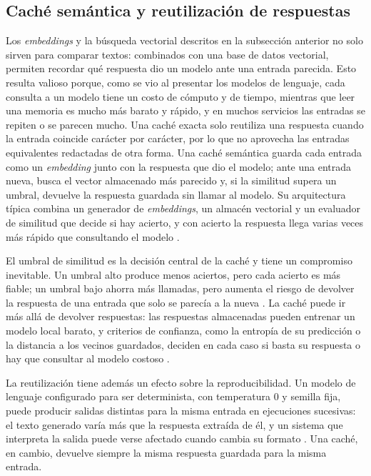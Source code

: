 \subsection{Caché semántica y reutilización de respuestas}\label{sec:mt_cache}

Los \textit{embeddings} y la búsqueda vectorial descritos en la subsección anterior no solo sirven para comparar textos: combinados con una base de datos vectorial, permiten recordar qué respuesta dio un modelo ante una entrada parecida. Esto resulta valioso porque, como se vio al presentar los modelos de lenguaje, cada consulta a un modelo tiene un costo de cómputo y de tiempo, mientras que leer una memoria es mucho más barato y rápido, y en muchos servicios las entradas se repiten o se parecen mucho. Una caché exacta solo reutiliza una respuesta cuando la entrada coincide carácter por carácter, por lo que no aprovecha las entradas equivalentes redactadas de otra forma. Una caché semántica guarda cada entrada como un \textit{embedding} junto con la respuesta que dio el modelo; ante una entrada nueva, busca el vector almacenado más parecido y, si la similitud supera un umbral, devuelve la respuesta guardada sin llamar al modelo. Su arquitectura típica combina un generador de \textit{embeddings}, un almacén vectorial y un evaluador de similitud que decide si hay acierto, y con acierto la respuesta llega varias veces más rápido que consultando el modelo \cite{fu2023_gptcache}.

El umbral de similitud es la decisión central de la caché y tiene un compromiso inevitable. Un umbral alto produce menos aciertos, pero cada acierto es más fiable; un umbral bajo ahorra más llamadas, pero aumenta el riesgo de devolver la respuesta de una entrada que solo se parecía a la nueva \cite{ak2025_siu}. La caché puede ir más allá de devolver respuestas: las respuestas almacenadas pueden entrenar un modelo local barato, y criterios de confianza, como la entropía de su predicción o la distancia a los vecinos guardados, deciden en cada caso si basta su respuesta o hay que consultar al modelo costoso \cite{stogiannidis2023_cache}.

La reutilización tiene además un efecto sobre la reproducibilidad. Un modelo de lenguaje configurado para ser determinista, con temperatura 0 y semilla fija, puede producir salidas distintas para la misma entrada en ejecuciones sucesivas: el texto generado varía más que la respuesta extraída de él, y un sistema que interpreta la salida puede verse afectado cuando cambia su formato \cite{atil2025_nondeterminism}. Una caché, en cambio, devuelve siempre la misma respuesta guardada para la misma entrada.

